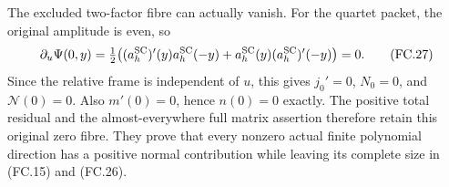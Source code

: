 The excluded two-factor fibre can actually vanish. For the quartet
packet, the original amplitude is even, so
\[
 \partial_u\Psi(0,y)=\tfrac12\bigl(
 (a_h^{\rm SC})'(y)a_h^{\rm SC}(-y)
 +a_h^{\rm SC}(y)(a_h^{\rm SC})'(-y)\bigr)=0.
 \tag{FC.27}
\]
Since the relative frame is independent of \(u\), this gives
\(j_0'=0\), \(N_0=0\), and \(\mathcal N(0)=0\).
Also \(m'(0)=0\), hence \(n(0)=0\) exactly. The positive
total residual and the almost-everywhere full matrix assertion
therefore retain this original zero fibre. They prove that every
nonzero actual finite polynomial direction has a positive normal
contribution while leaving its complete size in (FC.15) and (FC.26).
